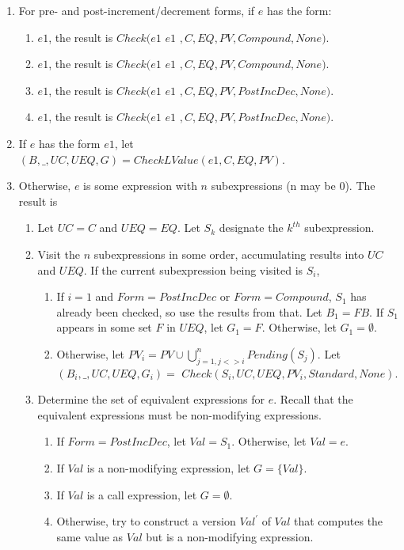 \begin{enumerate}
\item For pre- and post-increment/decrement forms, if $e$ has the form:
\begin{enumerate}
\item \code{++}$e1$, the result is  $Check(e1$ \code{ = } $e1$ $,C, EQ, PV, 
Compound, None)$.
\item \code{--}$e1$, the result is $Check(e1$ \code{ = } $e1$ $, C, EQ, PV,
Compound, None)$.
\item $e1$\code{++}, the result is  $Check(e1$ \code{ = } $ e1$ $,
C, EQ, PV, PostIncDec, None)$.
\item $e1$\code{--}, the result is $Check(e1$ \code{ = } $ e1$ $, C, EQ, PV, PostIncDec, None)$.
\end{enumerate}
\item If $e$ has the form \code{&}$e1$, let $(B, \_, UC, UEQ, G) = CheckLValue(e1, C, EQ, PV)$.
      
\item Otherwise, $e$ is some expression with $n$ subexpressions (n may be 0).  The
result is 
\begin{enumerate}
\item Let $UC = C$ and $UEQ = EQ$.  Let $S_k$ designate the $k^{th}$ subexpression.
\item Visit the $n$ subexpressions in some order, accumulating results into $UC$ and $UEQ$.  If the current subexpression being visited is $S_i$,
\begin{enumerate}
\item If $i = 1$ and $Form = PostIncDec$ or $Form = Compound$, $S_1$ has already
been checked, so use the results from that.  Let $B_1 = FB$.  If $S_1$ appears in some set $F$ in $UEQ$,
 let $G_1 = F$. Otherwise, let $G_1 = \emptyset$.
\item Otherwise, let $PV_i = PV \cup \bigcup_{j= 1, j <> i}^{n} Pending(S_j)$.
Let $(B_i, \_, UC, UEQ, G_i) =$  $Check(S_i, UC, UEQ, PV_i, Standard, None)$.
\end{enumerate}
\item Determine the set of equivalent expressions for $e$.  Recall that the equivalent expressions must be non-modifying expressions.
\begin{enumerate}
\item  If $Form = PostIncDec$, let $Val = S_1$.  Otherwise, let $Val = e$.
\item If $Val$ is a non-modifying expression, let $G  = \{ Val \}$.
\item If $Val$ is a call expression, let $G = \emptyset$.
\item Otherwise, try to construct a version $Val^\prime$ of $Val$ that computes the same value 
      as $Val$ but is a non-modifying expression. 
      

\end{enumerate}
\end{enumerate}
\end{enumerate}
